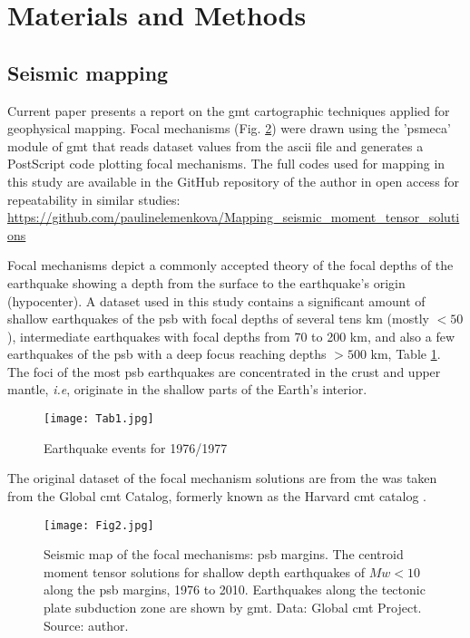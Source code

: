\documentclass{rrparticle}
\begin{document}
\section{Materials and Methods}
\subsection{Seismic mapping}

Current paper presents a report on the \ac{gmt} cartographic techniques applied for geophysical mapping. Focal mechanisms (Fig. \ref{pic2}) were drawn using the 'psmeca' module of \ac{gmt} that reads dataset values from the \ac{ascii} file and generates a PostScript code plotting focal mechanisms. The full codes used for mapping in this study are available in the GitHub repository of the author in open access for repeatability in similar studies: \\ \href{https://github.com/paulinelemenkova/Mapping_seismic_moment_tensor_solutions}{https://github.com/paulinelemenkova/Mapping\_seismic\_moment\_tensor\_solutions} 

Focal mechanisms depict a commonly accepted theory of the focal depths of the earthquake showing a depth from the surface to the earthquake's origin (hypocenter). A dataset used in this study contains a significant amount of shallow earthquakes of the \ac{psb} with focal depths of several tens km (mostly $<50$), intermediate earthquakes with focal depths from 70 to 200 km, and also a few earthquakes of the \ac{psb} with a deep focus reaching depths $> 500$ km, Table \ref{tab1}. The foci of the most \ac{psb} earthquakes are concentrated in the crust and upper mantle, \emph{i.e}, originate in the shallow parts of the Earth's interior.

\begin{figure}[H]
\centering
\texttt{[image: Tab1.jpg]}
\caption{Earthquake events for 1976/1977}
\label{tab1}
\end{figure}

The original dataset of the focal mechanism solutions are from the was taken from the Global \ac{cmt} Catalog, formerly known as the Harvard \ac{cmt} catalog \cite{Ekstrom}. 

\begin{figure}[H]
\centering
\texttt{[image: Fig2.jpg]}
\caption{Seismic map of the focal mechanisms: \ac{psb} margins. The centroid moment tensor solutions for shallow depth earthquakes of $Mw <10$ along the \ac{psb} margins, 1976 to 2010. Earthquakes along the tectonic plate subduction zone are shown by \ac{gmt}. Data: Global \ac{cmt} Project. Source: author.}
\label{pic2}
\end{figure}
\end{document}
